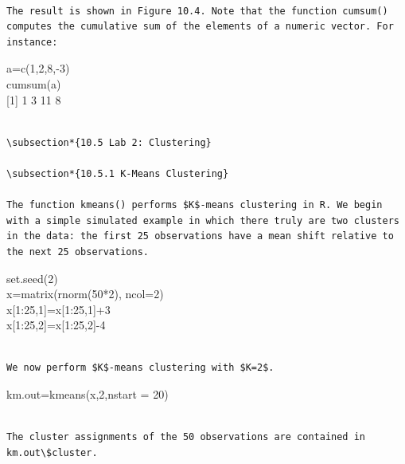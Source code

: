 \documentclass[10pt]{article}
\begin{document}
\begin{verbatim}

The result is shown in Figure 10.4. Note that the function cumsum() computes the cumulative sum of the elements of a numeric vector. For instance:
\end{verbatim}

\begin{displayquote}
a=c(1,2,8,-3)\\
cumsum(a)\\[0pt]
[1] 1 3 11 8
\end{displayquote}

\begin{verbatim}

\subsection*{10.5 Lab 2: Clustering}

\subsection*{10.5.1 K-Means Clustering}

The function kmeans() performs $K$-means clustering in R. We begin with a simple simulated example in which there truly are two clusters in the data: the first 25 observations have a mean shift relative to the next 25 observations.
\end{verbatim}

\begin{displayquote}
set.seed(2)\\
x=matrix(rnorm(50*2), ncol=2)\\[0pt]
x[1:25,1]=x[1:25,1]+3\\[0pt]
x[1:25,2]=x[1:25,2]-4
\end{displayquote}

\begin{verbatim}

We now perform $K$-means clustering with $K=2$.
\end{verbatim}

\begin{displayquote}
km.out=kmeans(x,2,nstart = 20)
\end{displayquote}

\begin{verbatim}

The cluster assignments of the 50 observations are contained in km.out\$cluster.
\end{verbatim}
\end{document}
